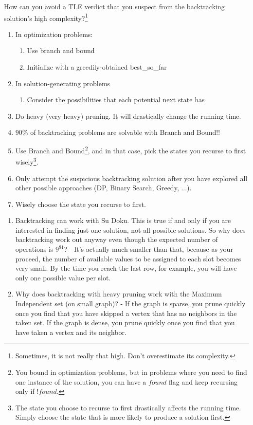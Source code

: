 \documentclass[12pt]{book}
\begin{document}
How can you avoid a TLE verdict that you suspect from the backtracking solution's high complexity?\footnote{Sometimes, it is not really that high. Don't overestimate its complexity.}
\begin{enumerate}[label = \roman*.]
\item In optimization problems:
\begin{enumerate}
\item Use branch and bound
\item Initialize with a greedily-obtained best\_so\_far
\end{enumerate}
\item 
In solution-generating problems
\begin{enumerate}
\item Consider the possibilities that each potential next state has
\end{enumerate}
\item Do heavy (very heavy) pruning. It will drastically change the running time.
\item $90\%$ of backtracking problems are solvable with Branch and Bound!!
\item Use Branch and Bound\footnote{You bound in optimization problems, but in problems where you need to find one instance of the solution, you can have a $found$ flag and keep recursing only if $!found$.}, and in that case, pick the states you recurse to first wisely\footnote{The state you choose to recurse to first drastically affects the running time. Simply choose the state that is more likely to produce a solution first.}.
\item Only attempt the suspicious backtracking solution after you have explored all other possible approaches (DP, Binary Search, Greedy, ...).
\item Wisely choose the state you recurse to first.
\end{enumerate}
\begin{enumerate}
\item Backtracking can work with Su Doku. This is true if and only if you are interested in finding just one solution, not all possible solutions. So why does backtracking work out anyway even though the expected number of operations is $9^{81}$? - It's actually much smaller than that, because as your proceed, the number of available values to be assigned to each slot becomes very small. By the time you reach the last row, for example, you will have only one possible value per slot.
\item Why does backtracking with heavy pruning work with the Maximum Independent set (on small graph)? - If the graph is sparse, you prune quickly once you find that you have skipped a vertex that has no neighbors in the taken set. If the graph is dense, you prune quickly once you find that you have taken a vertex and its neighbor.
\end{enumerate}
\end{document}
